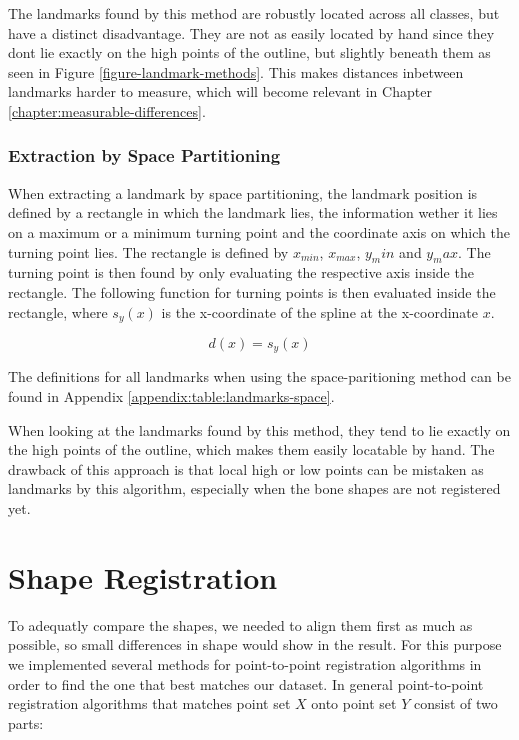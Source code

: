 \documentclass[pdftex,12pt,a4paper]{report}
\begin{document}
The landmarks found by this method are robustly located across all classes, but have a distinct disadvantage. They are
not as easily located by hand since they dont lie exactly on the high points of the outline, but slightly beneath
them  as seen in Figure \ref{figure-landmark-methods}. This makes distances inbetween landmarks harder to measure, which
will become relevant in Chapter \ref{chapter:measurable-differences}.

\subsubsection{Extraction by Space Partitioning}

When extracting a landmark by space partitioning, the landmark position is defined by a rectangle in which the landmark
lies, the information wether it lies on a maximum or a minimum turning point and the coordinate axis on which the
turning point lies. The rectangle is defined by $x_{min}$, $x_{max}$, $y_min$ and $y_max$. The turning point
is then found by only evaluating the respective axis inside the rectangle. The following function for turning points
is then evaluated inside the rectangle, where $s_y(x)$ is the x-coordinate of the spline at the x-coordinate $x$.

\begin{equation}
d(x) = s_y(x)
\end{equation}

The definitions for all landmarks when using the space-paritioning method can be found in Appendix
\ref{appendix:table:landmarks-space}.

When looking at the landmarks found by this method, they tend to lie exactly on the high points of the outline, which
makes them easily locatable by hand. The drawback of this approach is that local high or low points can be mistaken as
landmarks by this algorithm, especially when the bone shapes are not registered yet.

\section{Shape Registration}

To adequatly compare the shapes, we needed to align them first as much as possible, so small differences in shape would
show in the result. For this purpose we implemented several methods for point-to-point registration algorithms in order
to find the one that best matches our dataset. In general point-to-point registration algorithms that matches point set
$X$ onto point set $Y$ consist of two parts:
\end{document}
